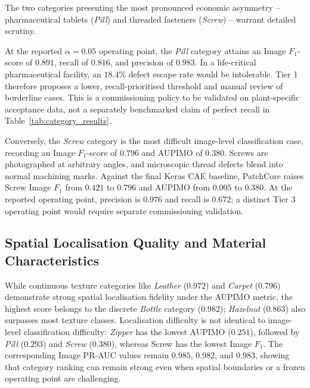 The two categories presenting the most pronounced economic asymmetry -- pharmaceutical tablets (\emph{Pill}) and threaded fasteners (\emph{Screw}) -- warrant detailed scrutiny. 

At the reported $\alpha=0.05$ operating point, the \emph{Pill} category attains an Image $F_1$-score of $0.891$, recall of $0.816$, and precision of $0.983$. In a life-critical pharmaceutical facility, an $18.4\%$ defect escape rate would be intolerable. Tier 1 therefore proposes a lower, recall-prioritised threshold and manual review of borderline cases. This is a commissioning policy to be validated on plant-specific acceptance data, not a separately benchmarked claim of perfect recall in Table~\ref{tab:category_results}.

Conversely, the \emph{Screw} category is the most difficult image-level classification case, recording an Image $F_1$-score of $0.796$ and AUPIMO of $0.380$. Screws are photographed at arbitrary angles, and microscopic thread defects blend into normal machining marks. Against the final Keras CAE baseline, PatchCore raises Screw Image $F_1$ from $0.421$ to $0.796$ and AUPIMO from $0.005$ to $0.380$. At the reported operating point, precision is $0.976$ and recall is $0.672$; a distinct Tier 3 operating point would require separate commissioning validation.

\subsection{Spatial Localisation Quality and Material Characteristics}

While continuous texture categories like \emph{Leather} ($0.972$) and \emph{Carpet} ($0.796$) demonstrate strong spatial localisation fidelity under the AUPIMO metric, the highest score belongs to the discrete \emph{Bottle} category ($0.982$); \emph{Hazelnut} ($0.863$) also surpasses most texture classes. Localisation difficulty is not identical to image-level classification difficulty: \emph{Zipper} has the lowest AUPIMO ($0.251$), followed by \emph{Pill} ($0.293$) and \emph{Screw} ($0.380$), whereas Screw has the lowest Image $F_1$. The corresponding Image PR-AUC values remain $0.985$, $0.982$, and $0.983$, showing that category ranking can remain strong even when spatial boundaries or a frozen operating point are challenging.
